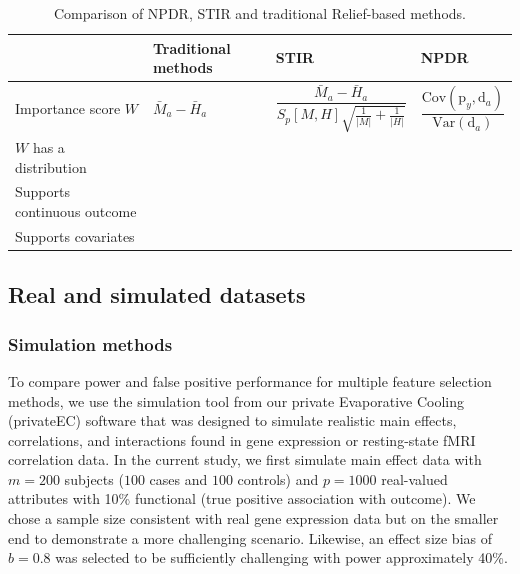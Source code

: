 \documentclass[10pt]{article}
\begin{document}
\begin{table}[h]

\begin{tabular}{p{4.5cm}C{2cm}C{3.2cm}C{2.7cm}}
                           & Traditional methods & STIR    & NPDR \\
\hline
Importance score $W$        & $\bar{M}_a - \bar{H}_a    $                      & $\dfrac{\bar{M}_a - \bar{H}_a }{S_p[M,H]\sqrt{\frac{1}{|M|}+\frac{1}{|H|}}}$ &   $\dfrac{\text{Cov}\left( \text{p}_y ,\text{d}_a  \right)}{\text{Var}\left( \text{d}_a  \right)}$ \\
$W$ has a distribution       &                                &      &   \\
Supports continuous outcome &                               &       &   \\
Supports covariates         &                                &       &  \\
\hline
\end{tabular}
\caption{Comparison of NPDR, STIR and traditional Relief-based methods.}
\label{tab:compare_npdr}
\end{table}



\subsection{Real and simulated datasets}
\subsubsection{Simulation methods}
To compare power and false positive performance for multiple feature selection methods, we use the simulation tool from our private Evaporative Cooling (privateEC) software \cite{le17} that was designed to simulate realistic main effects, correlations, and interactions found in gene expression or resting-state fMRI correlation data. In the current study, we first simulate main effect data with $m=200$ subjects ($100$ cases and $100$ controls) and $p=1000$ real-valued attributes with 10\% functional (true positive association with outcome).
We chose a sample size consistent with real gene expression data but on the smaller end to demonstrate a more challenging scenario.
Likewise, an effect size bias of $b=0.8$ was selected to be sufficiently challenging with power approximately 40\%. 
\end{document}

